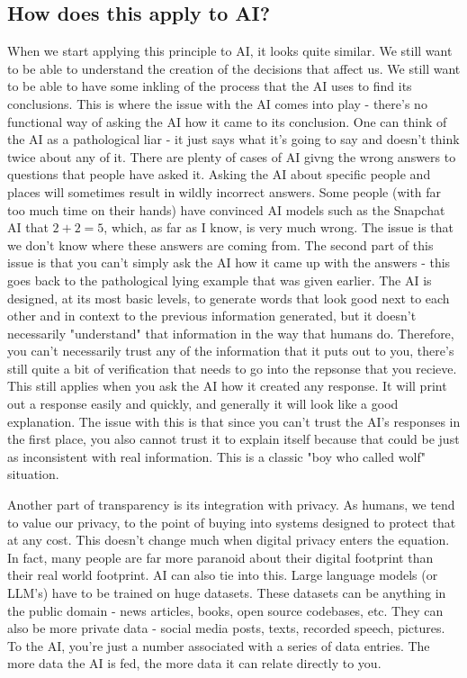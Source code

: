 \subsection{How does this apply to AI?}
When we start applying this principle to AI, it looks quite similar. We still want to be able
to understand the creation of the decisions that affect us. We still want to be able to have
some inkling of the process that the AI uses to find its conclusions. This is where the issue
with the AI comes into play - there's no functional way of asking the AI how it came to its
conclusion. One can think of the AI as a pathological liar - it just says what it's going to
say and doesn't think twice about any of it. There are plenty of cases of AI givng the wrong
answers to questions that people have asked it. Asking the AI about specific people and places
will sometimes result in wildly incorrect answers. Some people (with far too much time on their
hands) have convinced AI models such as the Snapchat AI that $2+2=5$, which, as far as I know,
is very much wrong. The issue is that we don't know where these answers are coming from. The
second part of this issue is that you can't simply ask the AI how it came up with the answers - 
this goes back to the pathological lying example that was given earlier. The AI is designed,
at its most basic levels, to generate words that look good next to each other and in context
to the previous information generated, but it doesn't necessarily "understand" that information
in the way that humans do. Therefore, you can't necessarily trust any of the information that
it puts out to you, there's still quite a bit of verification that needs to go into the repsonse
that you recieve. This still applies when you ask the AI how it created any response. It will
print out a response easily and quickly, and generally it will look like a good explanation.
The issue with this is that since you can't trust the AI's responses in the first place,
you also cannot trust it to explain itself because that could be just as inconsistent with 
real information. This is a classic "boy who called wolf" situation.

Another part of transparency is its integration with privacy. As humans, we tend to value our
privacy, to the point of buying into systems designed to protect that at any cost. This doesn't
change much when digital privacy enters the equation. In fact, many people are far more
paranoid about their digital footprint than their real world footprint. AI can also tie into
this. Large language models (or LLM's) have to be trained on huge datasets. These datasets can
be anything in the public domain - news articles, books, open source codebases, etc. They can
also be more private data - social media posts, texts, recorded speech, pictures. To the AI,
you're just a number associated with a series of data entries. The more data the AI is fed,
the more data it can relate directly to you.

